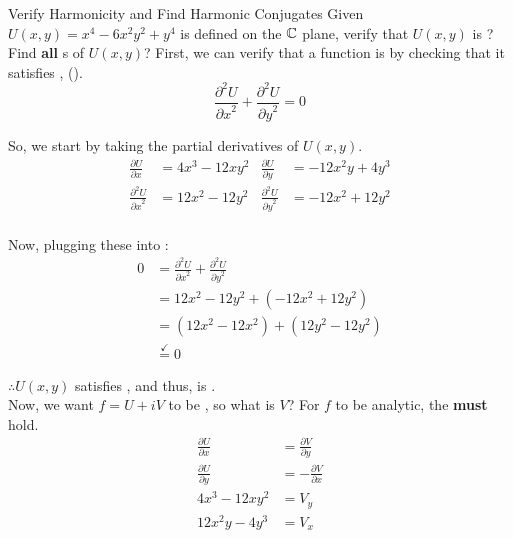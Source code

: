\begin{example}{Verify Harmonicity and Find Harmonic Conjugates}
  Given $U(x, y) = x^{4} - 6x^{2}y^{2} + y^{4}$ is defined on the $\operatorname{\mathbb{C}}$ plane, verify that $U(x, y)$ is ?
  Find \textbf{all} s of $U(x, y)$?
  \tcblower{}
  First, we can verify that a function is  by checking that it satisfies , ().
  \begin{equation*}
    \frac{\partial^{2} U}{{\partial x}^{2}} + \frac{\partial^{2} U}{{\partial y}^{2}} = 0
  \end{equation*}

  So, we start by taking the partial derivatives of $U(x, y)$.
  \begin{align*}
    \frac{\partial U}{\partial x} &= 4x^{3} - 12xy^{2} & \frac{\partial U}{\partial y} &= -12x^{2}y + 4y^{3} \\
    \frac{\partial^{2} U}{{\partial x}^{2}} &= 12x^{2} - 12y^{2} & \frac{\partial^{2} U}{{\partial y}^{2}} &= -12x^{2} + 12y^{2} \\
  \end{align*}

  Now, plugging these into :
  \begin{align*}
    0 &= \frac{\partial^{2} U}{{\partial x}^{2}} + \frac{\partial^{2} U}{{\partial y}^{2}} \\
      &= 12x^{2} - 12y^{2} + \left( -12x^{2} + 12y^{2} \right) \\
      &= \left( 12x^{2} - 12x^{2} \right) + \left( 12y^{2} - 12y^{2} \right) \\
      &\overset{\checkmark}{=} 0
  \end{align*}

  $\therefore U(x, y)$ satisfies , and thus, is . \\

  Now, we want $f = U + iV$ to be , so what is $V$?
  For $f$ to be analytic, the  \textbf{must} hold.
  \begin{align*}
    \frac{\partial U}{\partial x} &= \frac{\partial V}{\partial y} \\
    \frac{\partial U}{\partial y} &= - \frac{\partial V}{\partial x} \\
    4x^{3} - 12xy^{2} &= V_{y} \\
    12x^{2}y - 4y^{3} &= V_{x}
  \end{align*}


\end{example}
